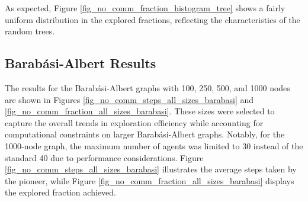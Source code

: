 As expected, Figure \ref{fig_no_comm_fraction_histogram_tree} shows a fairly uniform distribution in the explored fractions, reflecting the characteristics of the random trees.

\subsection{Barabási-Albert Results} 
\label{subsection_no_comm_barabasi_albert_results}

The results for the Barabási-Albert graphs with 100, 250, 500, and 1000 nodes are shown in Figures \ref{fig_no_comm_steps_all_sizes_barabasi} and \ref{fig_no_comm_fraction_all_sizes_barabasi}. These sizes were selected to capture the overall trends in exploration efficiency while accounting for computational constraints on larger Barabási-Albert graphs. Notably, for the 1000-node graph, the maximum number of agents was limited to 30 instead of the standard 40 due to performance considerations. Figure \ref{fig_no_comm_steps_all_sizes_barabasi} illustrates the average steps taken by the pioneer, while Figure \ref{fig_no_comm_fraction_all_sizes_barabasi} displays the explored fraction achieved.

